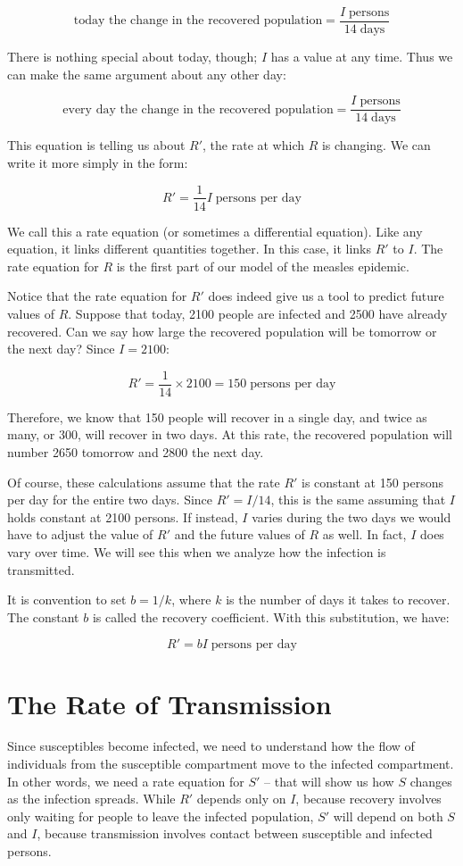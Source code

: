 \documentclass
[justified,nohyper]
{tufte-handout}
\begin{document}
\[
    \text{today the change in the recovered population} = 
    \dfrac{I\;\text{persons}}{14\;\text{days}}
\]

There is nothing special about today, though; $I$ has a value at any time. Thus we can make the same argument about any other day:

\[
    \text{every day the change in the recovered population} = 
    \dfrac{I\;\text{persons}}{14\;\text{days}}
\]

This equation is telling us about $R'$, the rate at which $R$ is changing. We can write it more simply in the form:

\[
    R' = \dfrac{1}{14}I \; \text{persons per day}
\]

We call this a rate equation (or sometimes a differential equation). Like any 
equation, it links different quantities together. In this case, it links $R'$ to 
$I$. The rate equation for $R$ is the first part of our model of the measles 
epidemic.

Notice that the rate equation for $R'$ does indeed give us a tool to predict 
future values of $R$. Suppose that today, 2100 people are infected and 2500 have 
already recovered. Can we say how large the recovered population will be tomorrow 
or the next day? Since $I=2100$:

\[
    R' = \dfrac{1}{14} \times 2100 = 150\;\text{persons per day}
\]

Therefore, we know that 150 people will recover in a single day, and twice as 
many, or 300, will recover in two days. At this rate, the recovered population 
will number 2650 tomorrow and 2800 the next day.

Of course, these calculations assume that the rate $R'$ is constant at 150 
persons per day for the entire two days. Since $R'=I/14$, this is the same 
assuming that $I$ holds constant at 2100 persons. If instead, $I$ varies during 
the two days we would have to adjust the value of $R'$ and the future values of 
$R$ as well. In fact, $I$ does vary over time. We will see this when we analyze 
how the infection is transmitted.

It is convention to set $b=1/k$, where $k$ is the number of days it takes to 
recover. The constant $b$ is called the recovery coefficient. With this 
substitution, we have:

\[
    R' = bI\;\text{persons per day}
\]

\section{The Rate of Transmission}
Since susceptibles become infected, we need to understand how the flow of 
individuals from the susceptible compartment move to the infected compartment. In 
other words, we need a rate equation for $S'$ -- that will show us how $S$ 
changes as the infection spreads. While $R'$ depends only on $I$, because 
recovery involves only waiting for people to leave the infected population, $S'$ 
will depend on both $S$ and $I$, because transmission involves contact between 
susceptible and infected persons.
\end{document}
